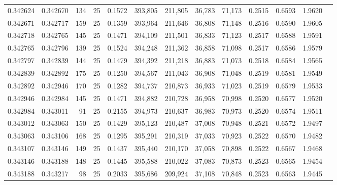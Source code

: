 \begin{tabular}{rrrrrrrrrrrrr}
0.342624 & 0.342670 &   134 &  25 &                                     0.1572 & 393,805 & 211,805 &  36,783 &  71,173 & 0.2515 & 0.6593 & 1.9620 \\
0.342671 & 0.342717 &   159 &  25 &                                     0.1359 & 393,964 & 211,646 &  36,808 &  71,148 & 0.2516 & 0.6590 & 1.9605 \\
0.342718 & 0.342765 &   145 &  25 &                                     0.1471 & 394,109 & 211,501 &  36,833 &  71,123 & 0.2517 & 0.6588 & 1.9591 \\
0.342765 & 0.342796 &   139 &  25 &                                     0.1524 & 394,248 & 211,362 &  36,858 &  71,098 & 0.2517 & 0.6586 & 1.9579 \\
0.342797 & 0.342839 &   144 &  25 &                                     0.1479 & 394,392 & 211,218 &  36,883 &  71,073 & 0.2518 & 0.6584 & 1.9565 \\
0.342839 & 0.342892 &   175 &  25 &                                     0.1250 & 394,567 & 211,043 &  36,908 &  71,048 & 0.2519 & 0.6581 & 1.9549 \\
0.342892 & 0.342946 &   170 &  25 &                                     0.1282 & 394,737 & 210,873 &  36,933 &  71,023 & 0.2519 & 0.6579 & 1.9533 \\
0.342946 & 0.342984 &   145 &  25 &                                     0.1471 & 394,882 & 210,728 &  36,958 &  70,998 & 0.2520 & 0.6577 & 1.9520 \\
0.342984 & 0.343011 &    91 &  25 &                                     0.2155 & 394,973 & 210,637 &  36,983 &  70,973 & 0.2520 & 0.6574 & 1.9511 \\
0.343012 & 0.343063 &   150 &  25 &                                     0.1429 & 395,123 & 210,487 &  37,008 &  70,948 & 0.2521 & 0.6572 & 1.9497 \\
0.343063 & 0.343106 &   168 &  25 &                                     0.1295 & 395,291 & 210,319 &  37,033 &  70,923 & 0.2522 & 0.6570 & 1.9482 \\
0.343107 & 0.343146 &   149 &  25 &                                     0.1437 & 395,440 & 210,170 &  37,058 &  70,898 & 0.2522 & 0.6567 & 1.9468 \\
0.343146 & 0.343188 &   148 &  25 &                                     0.1445 & 395,588 & 210,022 &  37,083 &  70,873 & 0.2523 & 0.6565 & 1.9454 \\
0.343188 & 0.343217 &    98 &  25 &                                     0.2033 & 395,686 & 209,924 &  37,108 &  70,848 & 0.2523 & 0.6563 & 1.9445 \\

\end{tabular}
